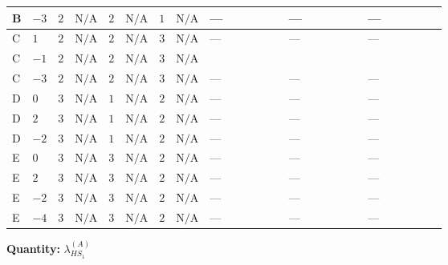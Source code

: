 \documentclass[8pt]{article}
\begin{document}
\begin{landscape}
\begin{longtable}{@{}llcccccc >{\raggedright\arraybackslash}p{0.21\linewidth} >{\raggedright\arraybackslash}p{0.21\linewidth} >{\raggedright\arraybackslash}p{0.21\linewidth}@{}}
\midrule
B & $-3$ & $2$ & $\text{N/A}$ & $2$ & $\text{N/A}$ & $1$ & $\text{N/A}$ & --- & --- & --- \\
\midrule
C & $1$ & $2$ & $\text{N/A}$ & $2$ & $\text{N/A}$ & $3$ & $\text{N/A}$ & --- & --- & --- \\
\midrule
C & $-1$ & $2$ & $\text{N/A}$ & $2$ & $\text{N/A}$ & $3$ & $\text{N/A}$ & \scriptsize\adjustbox{max width=\linewidth}{$\begin{gathered} -64 {\lambda_{7}} \left({\lambda_{7}}\right)^{*}\end{gathered}$} & \scriptsize\adjustbox{max width=\linewidth}{$\begin{gathered} +4 {\lambda_{11}} (\left({\lambda_{H H^\dagger S_1^\dagger S_2^\dagger}^{\rm Cross}}\right)^{*}+\left({\lambda_{X_{17}}^{(1)}}\right)^{*})\end{gathered}$} & \scriptsize\adjustbox{max width=\linewidth}{$\begin{gathered} +4 {\lambda_{H H^\dagger S_1^\dagger S_2^\dagger}^{\rm Cross}} (2 \left({\lambda_{H H^\dagger S_1^\dagger S_2^\dagger}^{\rm Cross}}\right)^{*}+\left({\lambda_{11}}\right)^{*})\end{gathered}$} \\
\midrule
C & $-3$ & $2$ & $\text{N/A}$ & $2$ & $\text{N/A}$ & $3$ & $\text{N/A}$ & --- & --- & --- \\
\midrule
D & $0$ & $3$ & $\text{N/A}$ & $1$ & $\text{N/A}$ & $2$ & $\text{N/A}$ & --- & --- & --- \\
\midrule
D & $2$ & $3$ & $\text{N/A}$ & $1$ & $\text{N/A}$ & $2$ & $\text{N/A}$ & --- & --- & --- \\
\midrule
D & $-2$ & $3$ & $\text{N/A}$ & $1$ & $\text{N/A}$ & $2$ & $\text{N/A}$ & --- & --- & --- \\
\midrule
E & $0$ & $3$ & $\text{N/A}$ & $3$ & $\text{N/A}$ & $2$ & $\text{N/A}$ & --- & --- & --- \\
\midrule
E & $2$ & $3$ & $\text{N/A}$ & $3$ & $\text{N/A}$ & $2$ & $\text{N/A}$ & --- & --- & --- \\
\midrule
E & $-2$ & $3$ & $\text{N/A}$ & $3$ & $\text{N/A}$ & $2$ & $\text{N/A}$ & --- & --- & --- \\
\midrule
E & $-4$ & $3$ & $\text{N/A}$ & $3$ & $\text{N/A}$ & $2$ & $\text{N/A}$ & --- & --- & --- \\
\midrule
\bottomrule
\end{longtable}
\clearpage
\noindent\textbf{Quantity: }$\lambda_{HS_1}^{(A)}$\par\smallskip

\end{landscape}
\end{document}
